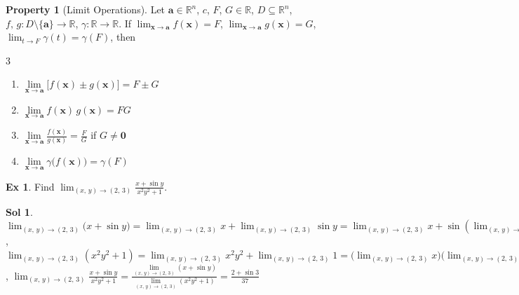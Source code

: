 \documentclass[12pt]{extarticle}
\newcommand{\ds}{\displaystyle}
\theoremstyle{definition}
\newtheorem*{prp}{Property}
\newtheorem*{ex}{Ex}
\newtheorem*{sol}{Sol}
\newcommand{\va}{\mathbf{a}}
\newcommand{\vb}{\mathbf{b}}
\newcommand{\vx}{\mathbf{x}}
\newcommand{\vX}{\mathbf{X}}
\newcommand{\vy}{\mathbf{y}}
\newcommand{\vZero}{\mathbf{0}}
\newcommand{\ga}{\gamma}
\newcommand{\bbbr}{\mathbb{R}}
\begin{document}
\begin{prp}[Limit Operations]
  Let $\va\in\bbbr^n$, $c$, $F$, $G\in\bbbr$, $\ds D\subseteq\bbbr^n$, $f,\,g: D\setminus\{\va\}\to\bbbr$, $\ga:\bbbr\to\bbbr$.  
If $\ds\lim_{\vx\to\va} f(\vx) = F$, $\ds\lim_{\vx\to\va} g(\vx) = G$, $\ds\lim_{t\to F}\ga(t) = \ga(F)$, then
  \begin{multicols}{3}
    \begin{enumerate}\setlength{\itemsep}{0pt}
      \item $\ds\lim\limits_{\vx\to\va}\big[f(\vx)\pm g(\vx)\big] = F \pm G$
      \item $\ds\lim\limits_{\vx\to\va} f(\vx)\,g(\vx) = FG$
      \item $\ds\lim\limits_{\vx\to\va} \frac{f(\vx)}{g(\vx)} = \frac{F}{G}$ if $G\ne\vZero$
      \item $\ds\lim\limits_{\vx\to \va} \ga\big(f(\vx)\big) = \ga(F)$
    \end{enumerate}
  \end{multicols}
\end{prp}

\begin{ex} 
  Find $\ds\lim_{(x,\,y)\to(2,\,3)}\frac{x + \sin y}{x^2 y^2 + 1}$. 
\end{ex}

\begin{sol}
  $\ds\lim_{(x,\,y)\to (2,\,3)}\big(x + \sin y\big) = \lim_{(x,\,y)\to (2,\,3)}x + \lim_{(x,\,y)\to (2,\,3)}\sin y = \lim_{(x,\,y)\to (2,\,3)}x + \sin\left(\lim_{(x,\,y)\to (2,\,3)} y\right) = 2 + \sin 3$, $\ds\lim_{(x,\,y)\to (2,\,3)}\left(x^2 y^2 + 1\right) = \lim_{(x,\,y)\to (2,\,3)}x^2 y^2 + \lim_{(x,\,y)\to (2,\,3)}1 = \Big(\lim_{(x,\,y)\to (2,\,3)}x\Big)\Big(\lim_{(x,\,y)\to (2,\,3)}x\Big)\Big(\lim_{(x,\,y)\to (2,\,3)}y\Big)\Big(\lim_{(x,\,y)\to (2,\,3)}y\Big) + 1 = 2^2 3^2 + 1 = 37$, $\ds\lim_{(x,\,y)\to (2,\,3)}\frac{x + \sin y}{x^2 y^2 + 1} = \frac{\lim\limits_{(x,\,y)\to (2,\,3)}(x + \sin y)}{\lim\limits_{(x,\,y)\to (2,\,3)}(x^2 y^2 + 1)} = \frac{2 + \sin 3}{37}$
\end{sol}
\end{document}
